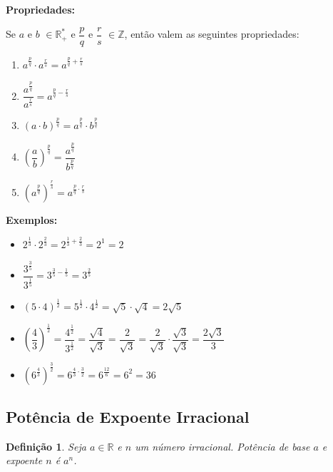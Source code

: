 \textbf{Propriedades:}

Se $a$ e $b$ $ \in \mathbb{R}^*_+$ e  $\dfrac{p}{q}$ e $\dfrac{r}{s} $ $ \in \mathbb{Z}$, então valem as seguintes propriedades:


\begin{enumerate}

\item $a^{\frac{p}{q}} \cdot a^{\frac{r}{s}} = a^{\frac{p}{q} + \frac{r}{s}}$

\item $\dfrac{a^{\frac{p}{q} }}{a^{\frac{r}{s} } } = a^{\frac{p}{q} - \frac{r}{s}}$

\item $(a\cdot b)^{\frac{p}{q}} = a^{\frac{p}{q}} \cdot b^{\frac{p}{q}}$

\item $\left(\dfrac{a}{b}\right)^{\frac{p}{q}} = \dfrac{a^{\frac{p}{q} }}{b^{\frac{p}{q} } }  $

\item $(a^{\frac{p}{q}})^{\frac{r}{s}} =  a^{\frac{p}{q} \cdot \frac{r}{s}   }$

\end{enumerate}


\textbf{Exemplos:}

\begin{itemize}

	\item $2^{\frac{1}{3}} \cdot 2^{\frac{2}{3}} = 2^{\frac{1}{3} + \frac{2}{3}} = 2^1 = 2$
	\item $\dfrac{3^{\frac{3}{5} }}{3^{\frac{1}{5} } } = 3^{\frac{3}{5} - \frac{1}{5}} = 3^{\frac{2}{5}}$
	\item $(5\cdot 4)^{\frac{1}{2}} = 5^{\frac{1}{2}} \cdot 4^{\frac{1}{2}} = \sqrt{5} \cdot \sqrt{4} = 2 \sqrt{5}$
	\item $\left(\dfrac{4}{3}\right)^{\frac{1}{2}} = \dfrac{4^{\frac{1}{2} }}{3^{\frac{1}{2} } } = \dfrac{\sqrt{4}}{\sqrt{3}} = \dfrac{2}{\sqrt{3}} = \dfrac{2}{\sqrt{3}} \cdot \dfrac{\sqrt{3}}{\sqrt{3}} = \dfrac{2\sqrt{3}}{3}  $
	\item $(6^{\frac{4}{3}})^{\frac{3}{2}} =  6^{\frac{4}{3} \cdot \frac{3}{2}   } = 6^{\frac{12}{6}}= 6^2 = 36$
\end{itemize}
\subsection{Potência de Expoente Irracional}

\newtheorem{definicao}{Definição}
\begin{definicao}
	Seja $a \in \mathbb{R} $ e $n$ um número irracional. Potência de base $a$ e expoente $n$ é  $a^n$.	
\end{definicao}

